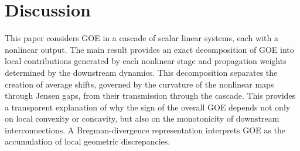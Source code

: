 \documentclass[onecolumn]{IEEEtran}
\newcommand{\GOE}{\operatorname{GOE}}
\newcommand{\avg}[1]{\left\langle #1\right\rangle}
\begin{document}

 \section{Discussion}

This paper considers  GOE in a cascade of scalar linear systems, each with a nonlinear output. The main result  provides an exact decomposition of GOE   into local contributions generated by each nonlinear stage and propagation weights determined by the downstream dynamics. This decomposition separates the creation of average shifts, governed by the curvature of the nonlinear maps through Jensen gaps, from their transmission through the cascade. This provides a transparent explanation of why the sign of the overall GOE depends not only on local convexity or concavity,  but also on the monotonicity of downstream interconnections.
  A  Bregman-divergence representation interprets GOE as the accumulation of local geometric discrepancies.
\end{document}
